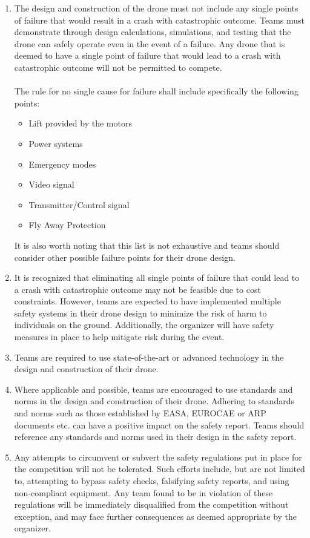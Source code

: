 \documentclass{article}
\begin{document}
\begin{enumerate}
  \item The design and construction of the drone must not include any single points of failure that would result in a crash with catastrophic outcome. Teams must demonstrate through design calculations, simulations, and testing that the drone can safely operate even in the event of a failure. Any drone that is deemed to have a single point of failure that would lead to a crash with catastrophic outcome will not be permitted to compete. \\ \\
  The rule for no single cause for failure shall include specifically the following points:
    \begin{itemize}
      \item Lift provided by the motors
      \item Power systems
      \item Emergency modes
      \item Video signal
      \item Transmitter/Control signal
      \item Fly Away Protection 
    \end{itemize}
  It is also worth noting that this list is not exhaustive and teams should consider other possible failure points for their drone design.
  \item It is recognized that eliminating all single points of failure that could lead to a crash with catastrophic outcome may not be feasible due to cost constraints. However, teams are expected to have implemented multiple safety systems in their drone design to minimize the risk of harm to individuals on the ground. Additionally, the organizer will have safety measures in place to help mitigate risk during the event.
  \item Teams are required to use state-of-the-art or advanced technology in the design and construction of their drone.
  \item Where applicable and possible, teams are encouraged to use standards and norms in the design and construction of their drone. Adhering to standards and norms such as those established by EASA, EUROCAE or ARP documents etc. can have a positive impact on the safety report. Teams should reference any standards and norms used in their design in the safety report.
  \item Any attempts to circumvent or subvert the safety regulations put in place for the competition will not be tolerated. Such efforts include, but are not limited to, attempting to bypass safety checks, falsifying safety reports, and using non-compliant equipment. Any team found to be in violation of these regulations will be immediately disqualified from the competition without exception, and may face further consequences as deemed appropriate by the organizer.

\end{enumerate}
\end{document}
